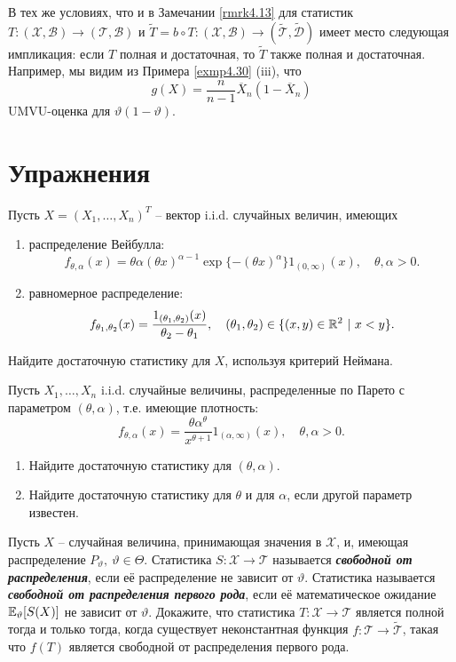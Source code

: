\begin{rmrk} \label{rmrk4.31}
	В тех же условиях, что и в Замечании \ref{rmrk4.13} для статистик $T\colon(\mathcal{X}, \mathcal{B}) \rightarrow (\mathcal{T}, \mathcal{B})$ и $\widetilde{T} = b \circ T \colon (\mathcal{X}, \mathcal{B}) \rightarrow (\widetilde{\mathcal{T}}, \widetilde{\mathcal{D}})$ имеет место следующая импликация: если $T$ полная и достаточная, то $\widetilde{T}$ также полная и достаточная. Например, мы видим из Примера \ref{exmp4.30} (iii), что
	\[ g(X) = \frac{n}{n-1}\overline{X}_n(1-\overline{X}_n) \]
	UMVU-оценка для $\vartheta(1-\vartheta)$.
\end{rmrk}

\raggedbottom
\pagebreak
\section*{Упражнения}
\begin{exc}
	Пусть $X = (X_1, \dots, X_n)^T$ -- вектор i.i.d. случайных величин, имеющих
	\begin{enumerate}
		\item распределение Вейбулла:
		\[ f_{\theta, \alpha}(x) = \theta \alpha(\theta x)^{\alpha - 1} \exp\{-(\theta x)^\alpha\} 1_{(0, \infty)}(x), \quad \theta, \alpha > 0.  \]
		\item равномерное распределение:
		\[ f_{\theta_1, \theta_2}(x)=  \frac{1_{(\theta_1, \theta_2)}(x)}{\theta_2 - \theta_1}, \quad (\theta_1, \theta_2) \in \{(x, y) \in \mathbb{R}^2 \ |\ x < y \}.\]
	\end{enumerate}
	Найдите достаточную статистику для $X$, используя критерий Неймана.
\end{exc}

\begin{exc}
	Пусть $X_1, \dots, X_n$ i.i.d. случайные величины, распределенные по Парето с параметром $(\theta, \alpha)$, т.е. имеющие плотность:
	\[ f_{\theta,\alpha}(x) = \frac{\theta \alpha^\theta}{x^{\theta + 1}} 1_{(\alpha, \infty)}(x), \quad \theta, \alpha > 0.  \]
	\begin{enumerate}
		\item Найдите достаточную статистику для $(\theta, \alpha)$.
		\item Найдите достаточную статистику для $\theta$ и для $\alpha$, если другой параметр известен.
	\end{enumerate}
\end{exc}

\begin{exc}
	Пусть $X$ -- случайная величина, принимающая значения в $\mathcal{X}$, и, имеющая распределение $P_\vartheta,\ \vartheta \in \Theta$. Статистика $S\colon \mathcal{X} \rightarrow \mathcal{T}$ называется \textbf{\textit{свободной от распределения}}, если её распределение не зависит от $\vartheta$. Статистика называется \textbf{\textit{свободной от распределения первого рода}}, если её математическое ожидание $\mathbb{E}_\vartheta[S(X)]$ не зависит от $\vartheta$. Докажите, что статистика $T\colon \mathcal{X} \rightarrow \mathcal{T}$ является полной тогда и только тогда, когда существует неконстантная функция $f\colon\mathcal{T} \rightarrow \widetilde{\mathcal{T}}$, такая что $f(T)$ является свободной от распределения первого рода.
\end{exc}

